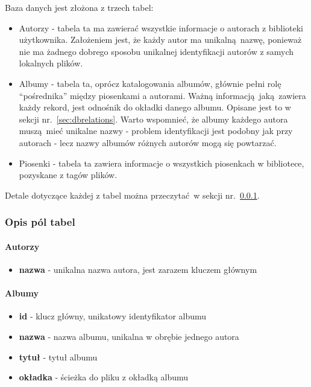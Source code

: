 Baza danych jest złożona z trzech tabel:

\begin{itemize}
	\item Autorzy - tabela ta ma zawierać wszystkie informacje o autorach z biblioteki użytkownika. Założeniem jest, że każdy autor ma unikalną nazwę, ponieważ nie ma żadnego dobrego sposobu unikalnej identyfikacji autorów z samych lokalnych plików.

	\item Albumy - tabela ta, oprócz katalogowania albumów, głównie pełni rolę \enquote{pośrednika} między piosenkami a autorami. Ważną informacją jaką zawiera każdy rekord, jest odnośnik do okładki danego albumu. Opisane jest to w sekcji nr.~\ref{sec:dbrelations}. Warto wspomnieć, że albumy każdego autora muszą mieć unikalne nazwy - problem identyfikacji jest podobny jak przy autorach - lecz nazwy albumów różnych autorów mogą się powtarzać. 
	
	\item Piosenki - tabela ta zawiera informacje o wszystkich piosenkach w bibliotece, pozyskane z tagów plików.
\end{itemize}

Detale dotyczące każdej z tabel można przeczytać w sekcji nr.~\ref{sec:dbtables}.

\subsubsection{Opis pól tabel} \label{sec:dbtables}

\paragraph{Autorzy}

\begin{itemize}
	\item \textbf{nazwa} - unikalna nazwa autora, jest zarazem kluczem głównym
\end{itemize}

\paragraph{Albumy}

\begin{itemize}
	\item \textbf{id} - klucz główny, unikatowy identyfikator albumu
	
	\item \textbf{nazwa} - nazwa albumu, unikalna w obrębie jednego autora
	
	\item \textbf{tytuł} - tytuł albumu

	\item \textbf{okładka} - ścieżka do pliku z okładką albumu
\end{itemize}

